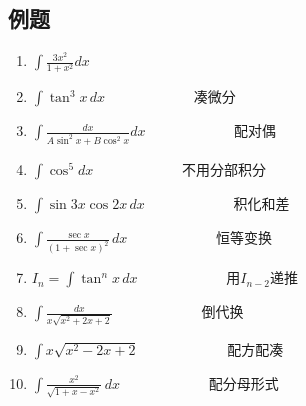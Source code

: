 \subsection{例题}
\begin{enumerate}
	\item $\displaystyle\int \frac{3x^2}{1+x^2}dx$
	\item $\displaystyle\int \tan^3 x\,dx\qquad\qquad\qquad$ 凑微分
	\item $\displaystyle\int \frac{dx}{A\sin^2 x+B\cos^2 x}dx\qquad\qquad\qquad$ 配对偶
	\item $\displaystyle\int \cos^5dx\qquad\qquad\qquad$ 不用分部积分
	\item $\displaystyle\int \sin 3x \cos 2x\,dx\qquad\qquad\qquad$ 积化和差
	\item $\displaystyle\int \frac{\sec x}{(1+\sec x)^2}\,dx\qquad\qquad\qquad$ 恒等变换
	\item $I_n=\displaystyle\int \tan^n x\,dx\qquad\qquad\qquad$ 用$I_{n-2}$递推
	\item $\displaystyle\int \frac{dx}{x\sqrt{x^2+2x+2}}\qquad\qquad\qquad$ 倒代换
	\item $\displaystyle\int x\sqrt{x^2-2x+2}\qquad\qquad\qquad$ 配方配凑
	\item $\displaystyle\int \frac{x^2}{\sqrt{1+x-x^2}}\,dx\qquad\qquad\qquad$ 配分母形式
\end{enumerate}